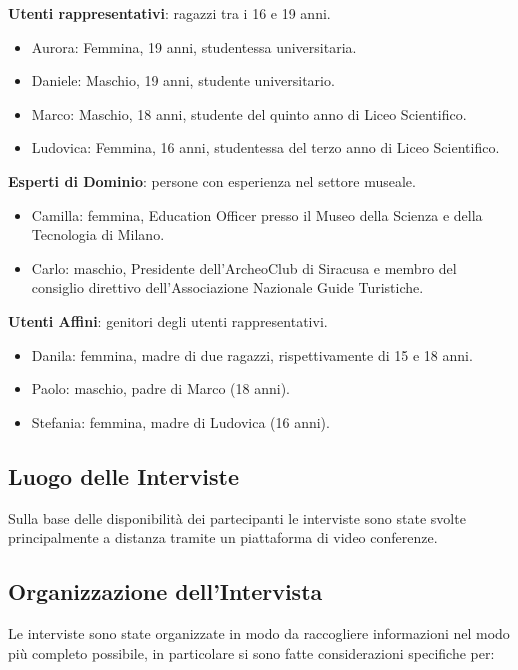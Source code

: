 \documentclass{article}
\begin{document}
\textbf{Utenti rappresentativi}: ragazzi tra i 16 e 19 anni.
\begin{itemize}
\item Aurora: Femmina, 19 anni, studentessa universitaria.
\item 	Daniele: Maschio, 19 anni, studente universitario.
\item 	Marco: Maschio, 18 anni, studente del quinto anno di Liceo Scientifico.
\item 	Ludovica: Femmina, 16 anni, studentessa del terzo anno di Liceo Scientifico.
\end{itemize}

\textbf{Esperti di Dominio}: persone con esperienza nel settore museale.
\begin{itemize}
\item Camilla: femmina, Education Officer presso il Museo della Scienza e della Tecnologia di Milano.
\item Carlo: maschio, Presidente dell’ArcheoClub di Siracusa e membro del consiglio direttivo dell’Associazione Nazionale Guide Turistiche.
\end{itemize}

\textbf{Utenti Affini}: genitori degli utenti rappresentativi.
\begin{itemize}
\item Danila: femmina, madre di due ragazzi, rispettivamente di 15 e 18 anni.
\item 	Paolo: maschio, padre di Marco (18 anni).
\item 	Stefania: femmina, madre di Ludovica (16 anni).
\end{itemize}

\subsection{Luogo delle Interviste}

Sulla base delle disponibilità dei partecipanti le interviste sono state svolte principalmente a distanza tramite un piattaforma di video conferenze.

\subsection{Organizzazione dell'Intervista}
Le interviste sono state organizzate in modo da raccogliere informazioni nel modo più completo possibile, in particolare si sono fatte considerazioni specifiche per:
\end{document}
